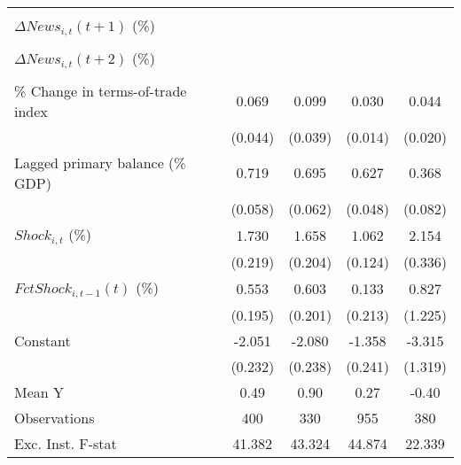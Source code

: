 {\begin{tabular}{l*{4}{c}}
                    &                     &                     &                     &                     \\
\addlinespace
$ \Delta News_{i,t}(t+1)$ (\%)&                     &                     &                     &                     \\
                    &                     &                     &                     &                     \\
\addlinespace
$ \Delta News_{i,t}(t+2)$ (\%)&                     &                     &                     &                     \\
                    &                     &                     &                     &                     \\
\addlinespace
\% Change in terms-of-trade index&       0.069         &       0.099\sym{**} &       0.030\sym{**} &       0.044\sym{**} \\
                    &     (0.044)         &     (0.039)         &     (0.014)         &     (0.020)         \\
\addlinespace
Lagged primary balance (\% GDP)&       0.719\sym{***}&       0.695\sym{***}&       0.627\sym{***}&       0.368\sym{***}\\
                    &     (0.058)         &     (0.062)         &     (0.048)         &     (0.082)         \\
\addlinespace
$ Shock_{i,t}$ (\%) &       1.730\sym{***}&       1.658\sym{***}&       1.062\sym{***}&       2.154\sym{***}\\
                    &     (0.219)         &     (0.204)         &     (0.124)         &     (0.336)         \\
\addlinespace
$ FctShock_{i,t-1}(t)$ (\%)&       0.553\sym{**} &       0.603\sym{***}&       0.133         &       0.827         \\
                    &     (0.195)         &     (0.201)         &     (0.213)         &     (1.225)         \\
\addlinespace
Constant            &      -2.051\sym{***}&      -2.080\sym{***}&      -1.358\sym{***}&      -3.315\sym{**} \\
                    &     (0.232)         &     (0.238)         &     (0.241)         &     (1.319)         \\
\midrule
Mean Y              &        0.49         &        0.90         &        0.27         &       -0.40         \\
Observations        &         400         &         330         &         955         &         380         \\
Exc. Inst. F-stat   &      41.382         &      43.324         &      44.874         &      22.339         \\
\bottomrule
\end{tabular}
}
